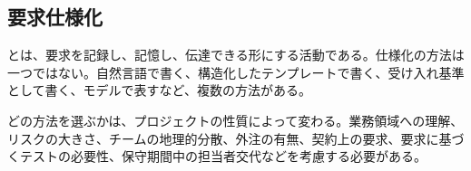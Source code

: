 \subsection{要求仕様化}

とは、要求を記録し、記憶し、伝達できる形にする活動である。仕様化の方法は一つではない。自然言語で書く、構造化したテンプレートで書く、受け入れ基準として書く、モデルで表すなど、複数の方法がある。

どの方法を選ぶかは、プロジェクトの性質によって変わる。業務領域への理解、リスクの大きさ、チームの地理的分散、外注の有無、契約上の要求、要求に基づくテストの必要性、保守期間中の担当者交代などを考慮する必要がある。

